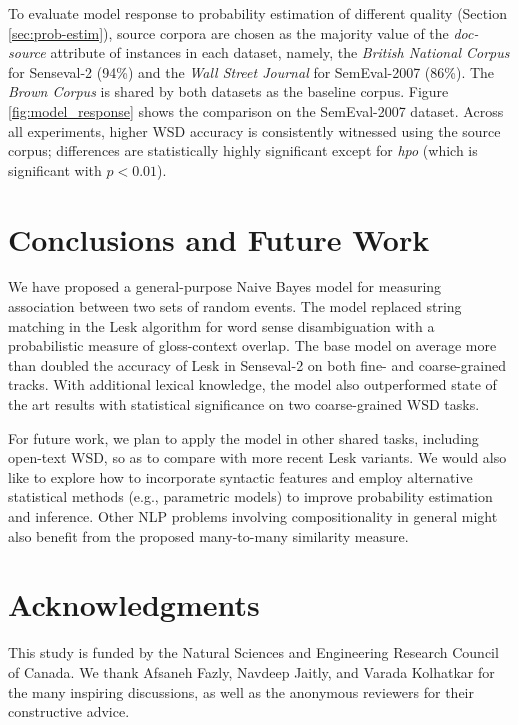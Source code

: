 \documentclass[11pt]{article}
\begin{document}
To evaluate model response to probability estimation of different
quality (Section \ref{sec:prob-estim}), source corpora are chosen as
the majority value of the \textit{doc-source} attribute of instances
in each dataset, namely, the \textit{British National Corpus} for
Senseval-2 (94\%) and the \textit{Wall Street Journal} for
SemEval-2007 (86\%). The \textit{Brown Corpus} is shared by both
datasets as the baseline corpus. Figure \ref{fig:model_response} shows
the comparison on the SemEval-2007 dataset. Across all experiments,
higher WSD accuracy is consistently witnessed using the source corpus;
differences are statistically highly significant except for
\textit{hpo} (which is significant with $p<0.01$).

\section{Conclusions and Future Work}
\label{sec:disc-concl}
We have proposed a general-purpose Naive Bayes model for measuring
association between two sets of random events. The model replaced
string matching in the Lesk algorithm for word sense disambiguation
with a probabilistic measure of gloss-context overlap. The base model
on average more than doubled the accuracy of Lesk in Senseval-2 on
both fine- and coarse-grained tracks. With additional lexical
knowledge, the model also outperformed state of the art results with
statistical significance on two coarse-grained WSD tasks.

For future work, we plan to apply the model in other shared tasks,
including open-text WSD, so as to compare with more recent Lesk
variants. We would also like to explore how to incorporate syntactic
features and employ alternative statistical methods (e.g., parametric
models) to improve probability estimation and inference. Other NLP
problems involving compositionality in general might also benefit from
the proposed many-to-many similarity measure.

\section*{Acknowledgments}
This study is funded by the Natural Sciences and Engineering Research
Council of Canada. We thank Afsaneh Fazly, Navdeep Jaitly, and Varada
Kolhatkar for the many inspiring discussions, as well as the anonymous
reviewers for their constructive advice.


{\small}
\end{document}

